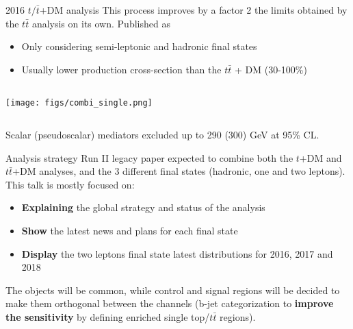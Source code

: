 \documentclass[9pt]{beamer}
\begin{document}
\begin{frame}{2016 $t/\bar t$+DM analysis}
\justifying
This process \alert{improves by a factor 2 } the limits obtained by the $t \bar t$ analysis on its own. Published as \href{http://cms.cern.ch/iCMS/analysisadmin/cadilines?line=EXO-18-010&tp=an&id=2085&ancode=EXO-18-010}{} 

\begin{itemize}
\item Only considering semi-leptonic and hadronic final states
\item Usually lower production cross-section than the $t \bar t$ + DM (30-100\%)
\end{itemize} \vfill

\begin{center}
\begin{columns}
	\begin{column}{1.0\textwidth}
		\begin{center}
			\texttt{[image: figs/combi\_single.png]}
    		 \end{center}
	\end{column} \hfill
\end{columns} \vfill

\end{center} \vfill 
Scalar (pseudoscalar) mediators \alert{excluded up to 290 (300) GeV} at 95\% CL. \vfill 

\end{frame}

\begin{frame}{Analysis strategy}
\justifying
Run II legacy paper expected to \alert{combine both the $t$+DM and $t \bar t$+DM analyses}, and the 3 different final states (hadronic, one and two leptons). \vfill
This talk is mostly focused on:
\begin{itemize}
\item \textbf{Explaining} the global strategy and status of the analysis 
\item \textbf{Show} the latest news and plans for each final state 
\item \textbf{Display} the two leptons final state latest distributions for 2016, 2017 and 2018
\end{itemize} \vfill
The objects will be common, while control and signal regions will be decided to make them orthogonal between the channels (b-jet categorization to \textbf{improve the sensitivity} by defining enriched single top/$t \bar t$ regions). \vfill
\end{frame}
\end{document}
